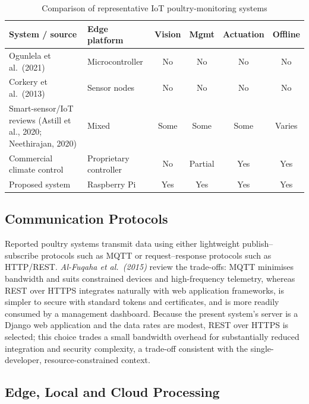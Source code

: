 \documentclass[12pt,a4paper]{report}
\begin{document}
\begin{table}[tbp]
\caption{Comparison of representative IoT poultry-monitoring systems}
\label{tab:iotsystems}
\centering
\footnotesize
\renewcommand{\arraystretch}{1.2}
\begin{tabularx}{\textwidth}{|X|l|c|c|c|c|}
\hline
\rowcolor{headerblue}
\textbf{System / source} & \textbf{Edge platform} & \textbf{Vision} & \textbf{Mgmt} & \textbf{Actuation} & \textbf{Offline} \\
\hline
Ogunlela et al.\ (2021) & Microcontroller & No & No & No & No \\
\hline
Corkery et al.\ (2013) & Sensor nodes & No & No & No & No \\
\hline
Smart-sensor/IoT reviews (Astill et al., 2020; Neethirajan, 2020) & Mixed & Some & Some & Some & Varies \\
\hline
Commercial climate control & Proprietary controller & No & Partial & Yes & Yes \\
\hline
Proposed system & Raspberry Pi & Yes & Yes & Yes & Yes \\
\hline
\end{tabularx}
\end{table}

\subsection{Communication Protocols}

Reported poultry systems transmit data using either lightweight publish--subscribe protocols such as MQTT or request--response protocols such as HTTP/REST. \textit{Al-Fuqaha et al.\ (2015)} review the trade-offs: MQTT minimises bandwidth and suits constrained devices and high-frequency telemetry, whereas REST over HTTPS integrates naturally with web application frameworks, is simpler to secure with standard tokens and certificates, and is more readily consumed by a management dashboard. Because the present system's server is a Django web application and the data rates are modest, REST over HTTPS is selected; this choice trades a small bandwidth overhead for substantially reduced integration and security complexity, a trade-off consistent with the single-developer, resource-constrained context.

\subsection{Edge, Local and Cloud Processing}
\end{document}
